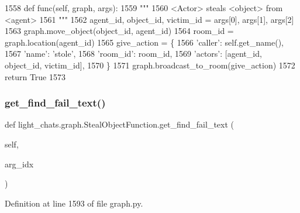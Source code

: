 \begin{DoxyCode}
1558     \textcolor{keyword}{def }func(self, graph, args):
1559         \textcolor{stringliteral}{"""}
1560 \textcolor{stringliteral}{        <Actor> steals <object> from <agent>}
1561 \textcolor{stringliteral}{        """}
1562         agent\_id, object\_id, victim\_id = args[0], args[1], args[2]
1563         graph.move\_object(object\_id, agent\_id)
1564         room\_id = graph.location(agent\_id)
1565         give\_action = \{
1566             \textcolor{stringliteral}{'caller'}: self.get\_name(),
1567             \textcolor{stringliteral}{'name'}: \textcolor{stringliteral}{'stole'},
1568             \textcolor{stringliteral}{'room\_id'}: room\_id,
1569             \textcolor{stringliteral}{'actors'}: [agent\_id, object\_id, victim\_id],
1570         \}
1571         graph.broadcast\_to\_room(give\_action)
1572         \textcolor{keywordflow}{return} \textcolor{keyword}{True}
1573 
\end{DoxyCode}
\mbox{\label{classlight__chats_1_1graph_1_1StealObjectFunction_a1ffe38f920399831ab1fba3cd324c106}} 
\subsubsection{\texorpdfstring{get\+\_\+find\+\_\+fail\+\_\+text()}{get\_find\_fail\_text()}}
{\footnotesize\ttfamily def light\+\_\+chats.\+graph.\+Steal\+Object\+Function.\+get\+\_\+find\+\_\+fail\+\_\+text (\begin{DoxyParamCaption}\item[{}]{self,  }\item[{}]{arg\+\_\+idx }\end{DoxyParamCaption})}



Definition at line 1593 of file graph.\+py.


